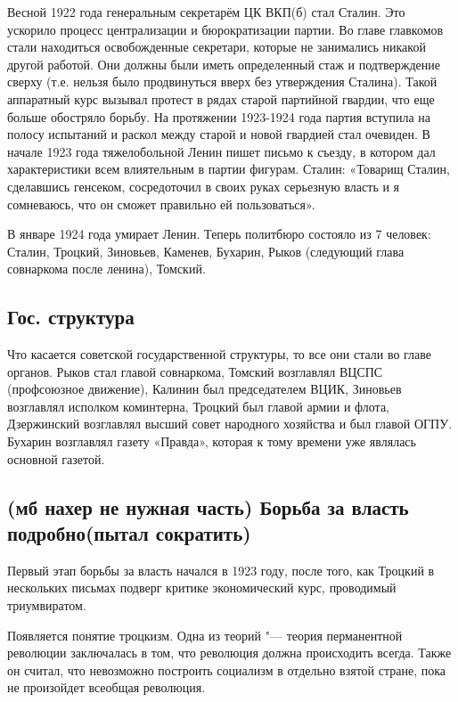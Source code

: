Весной 1922 года генеральным секретарём ЦК ВКП(б) стал Сталин. Это ускорило процесс централизации и бюрократизации партии. Во главе главкомов стали находиться освобожденные секретари, которые не занимались никакой другой работой. Они должны были иметь определенный стаж и подтверждение сверху (т.е. нельзя было продвинуться вверх без утверждения Сталина). Такой аппаратный курс вызывал протест в рядах старой партийной гвардии, что еще больше обостряло борьбу. На протяжении 1923-1924 года партия вступила на полосу испытаний и раскол между старой  и новой гвардией стал очевиден. В начале 1923 года тяжелобольной Ленин пишет письмо к съезду, в котором дал характеристики всем влиятельным в партии фигурам. Сталин: «Товарищ Сталин, сделавшись генсеком, сосредоточил в своих руках серьезную власть и я сомневаюсь, что он сможет правильно ей пользоваться».

В январе 1924 года умирает Ленин. Теперь политбюро состояло из 7 человек: Сталин, Троцкий, Зиновьев, Каменев, Бухарин, Рыков (следующий глава совнаркома после ленина), Томский. 

\subsection{Гос. структура}

Что касается советской государственной структуры, то все они стали во главе органов. Рыков стал главой совнаркома, Томский возглавлял ВЦСПС (профсоюзное движение), Калинин был председателем ВЦИК, Зиновьев возглавлял исполком коминтерна, Троцкий был главой армии и флота, Дзержинский возглавлял высший совет народного хозяйства и был главой ОГПУ. Бухарин возглавлял газету «Правда», которая к тому времени уже являлась основной газетой.

\subsection{(мб нахер не нужная часть) Борьба за власть подробно(пытал сократить)}

Первый этап борьбы за власть начался в 1923 году, после того, как Троцкий в нескольких письмах подверг критике экономический курс, проводимый триумвиратом.

Появляется понятие троцкизм. Одна из теорий "--- теория перманентной революции заключалась в том, что революция должна происходить всегда. Также он считал, что невозможно построить социализм в отдельно взятой стране, пока не произойдет всеобщая революция. 

